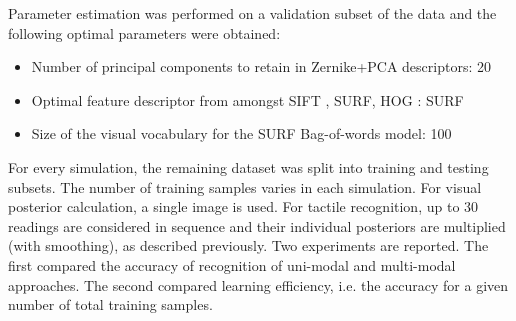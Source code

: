 \documentclass[letterpaper, 10 pt, conference]{ieeeconf}  %
\begin{document}
\begin{figure}
	\centering
\end{figure}
	
Parameter estimation was performed on a validation subset of the data and the following optimal parameters were obtained:
\begin{itemize}
	\item Number of principal components to retain in Zernike+PCA descriptors: 20
	\item Optimal feature descriptor from amongst SIFT \cite{Lowe1999}, SURF, HOG \cite{Dalal2005}: SURF
	\item Size of the visual vocabulary for the SURF Bag-of-words model: 100
\end{itemize}
For every simulation, the remaining dataset was split into training and testing subsets. The number of training samples varies in each simulation. For visual posterior calculation, a single image is used. For tactile recognition, up to 30 readings are considered in sequence and their individual posteriors are multiplied (with smoothing), as described previously. Two experiments are reported. The first compared the accuracy of recognition of uni-modal and multi-modal approaches. The second compared learning efficiency, i.e. the accuracy for a given number of total training samples.
\end{document}
